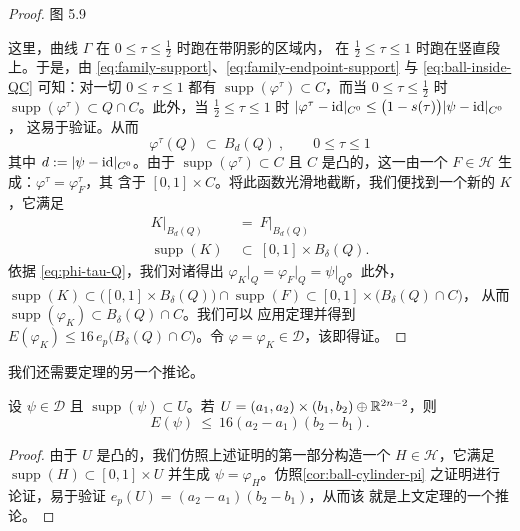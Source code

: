 \begin{proof}
\begin{minipage}{\linewidth}
图 5.9
\end{minipage}

这里，曲线 $\Gamma$ 在 $0\leq\tau\leq\frac{1}{2}$ 时跑在带阴影的区域内，%
在 $\frac{1}{2}\leq\tau\leq1$ 时跑在竖直段上。于是，由%
\eqref{eq:family-support}、\eqref{eq:family-endpoint-support} 与%
\eqref{eq:ball-inside-QC} 可知：对一切 $0\leq\tau\leq1$ 都有%
$\operatorname{supp}(\varphi^{\tau})\subset C$，而当 $0\leq\tau\leq\frac{1}{2}$%
时 $\operatorname{supp}(\varphi^{\tau})\subset Q\cap C$。此外，当%
$\frac{1}{2}\leq\tau\leq1$ 时%
$\lvert\varphi^{\tau}-\mathrm{id}\rvert_{C^{0}}\leq\bigl(1-s(\tau)\bigr)\lvert\psi-\mathrm{id}\rvert_{C^{0}}$，%
这易于验证。从而
\begin{equation}\label{eq:phi-tau-Q}
\varphi^{\tau}(Q)\ \subset\ B_{d}(Q)\ ,\qquad 0\leq\tau\leq1
\end{equation}
其中 $d:=\lvert\psi-\mathrm{id}\rvert_{C^{0}}$。由于 $\operatorname{supp}(\varphi^{\tau})\subset C$%
且 $C$ 是凸的，这一\trHomotopy{}由一个\trHamiltonianFunction{}%
$F\in\mathcal{H}$ 生成：$\varphi^{\tau}=\varphi^{\tau}_{F}$，其\trSupport{}%
含于 $[0,1]\times C$。将此函数光滑地截断，我们便找到一个新的%
\trHamiltonianFunction{} $K$，它满足
\begin{align*}
K\big|_{B_{d}(Q)}\ &=\ F\big|_{B_{d}(Q)}\\
\operatorname{supp}(K)\ &\subset\ [0,1]\times B_{\delta}(Q).
\end{align*}
依据 \eqref{eq:phi-tau-Q}，我们对诸\trTimeOneMap{}得出%
$\varphi_{K}\big|_{Q}=\varphi_{F}\big|_{Q}=\psi\big|_{Q}$。此外，%
$\operatorname{supp}(K)\subset\bigl([0,1]\times B_{\delta}(Q)\bigr)\cap\operatorname{supp}(F)\subset[0,1]\times\bigl(B_{\delta}(Q)\cap C\bigr)$，%
从而 $\operatorname{supp}(\varphi_{K})\subset B_{\delta}(Q)\cap C$。我们可以%
应用\trSikorav{}定理并得到%
$E(\varphi_{K})\leq16\,e_{p}\bigl(B_{\delta}(Q)\cap C\bigr)$。令%
$\varphi=\varphi_{K}\in\mathcal{D}$，该\trhLemma{}即得证。
\end{proof}

我们还需要\trSikorav{}定理的另一个推论。

\begin{lemma}\label{lem:energy-box}
设 $\psi\in\mathcal{D}$ 且 $\operatorname{supp}(\psi)\subset U$。若%
$U=(a_{1},a_{2})\times(b_{1},b_{2})\oplus\mathbb{R}^{2n-2}$，则
\[
E(\psi)\ \leq\ 16(a_{2}-a_{1})(b_{2}-b_{1}).
\]
\end{lemma}

\begin{proof}
由于 $U$ 是凸的，我们仿照上述证明的第一部分构造一个\trHamiltonianFunction{}%
$H\in\mathcal{H}$，它满足 $\operatorname{supp}(H)\subset[0,1]\times U$ 并生成%
$\psi=\varphi_{H}$。仿照\cref{cor:ball-cylinder-pi}
之证明进行论证，易于验证 $e_{p}(U)=(a_{2}-a_{1})(b_{2}-b_{1})$，从而该%
\trhLemma{}就是上文\trSikorav{}定理的一个推论。
\end{proof}

